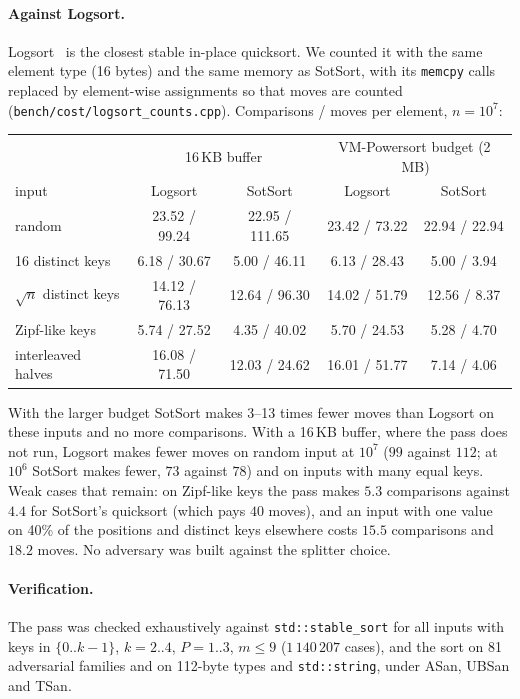 \documentclass[11pt]{article}
\theoremstyle{remark}
\begin{document}
\paragraph{Against Logsort.}
Logsort~\cite{logsort} is the closest stable in-place quicksort. We counted it with the same
element type (16 bytes) and the same memory as SotSort, with its \texttt{memcpy} calls replaced
by element-wise assignments so that moves are counted
(\texttt{bench/cost/logsort\_counts.cpp}). Comparisons / moves per element, $n=10^7$:
\begin{center}
\begin{tabular}{lcccc}
\toprule
 & \multicolumn{2}{c}{16\,KB buffer} & \multicolumn{2}{c}{VM-Powersort budget (2\,MB)}\\
input & Logsort & SotSort & Logsort & SotSort\\
\midrule
random            & 23.52 / 99.24 & 22.95 / 111.65 & 23.42 / 73.22 & 22.94 / 22.94\\
16 distinct keys  & 6.18 / 30.67  & 5.00 / 46.11   & 6.13 / 28.43  & 5.00 / 3.94\\
$\sqrt n$ distinct keys & 14.12 / 76.13 & 12.64 / 96.30 & 14.02 / 51.79 & 12.56 / 8.37\\
Zipf-like keys    & 5.74 / 27.52  & 4.35 / 40.02   & 5.70 / 24.53  & 5.28 / 4.70\\
interleaved halves& 16.08 / 71.50 & 12.03 / 24.62  & 16.01 / 51.77 & 7.14 / 4.06\\
\bottomrule
\end{tabular}
\end{center}
With the larger budget SotSort makes 3--13 times fewer moves than Logsort on these inputs and
no more comparisons. With a 16\,KB buffer, where the pass does not run, Logsort makes fewer
moves on random input at $10^7$ ($99$ against $112$; at $10^6$ SotSort makes fewer, $73$ against
$78$) and on inputs with many equal keys. Weak cases that remain: on Zipf-like keys the pass
makes $5.3$ comparisons against $4.4$ for SotSort's quicksort (which pays $40$ moves), and an
input with one value on 40\% of the positions and distinct keys elsewhere costs $15.5$
comparisons and $18.2$ moves. No adversary was built against the splitter choice.

\paragraph{Verification.}
The pass was checked exhaustively against \texttt{std::stable\_sort} for all inputs
with keys in $\{0..k-1\}$, $k=2..4$, $P=1..3$, $m\le9$ ($1\,140\,207$ cases), and
the sort on 81 adversarial families and on 112-byte types and \texttt{std::string},
under ASan, UBSan and TSan.
\end{document}
